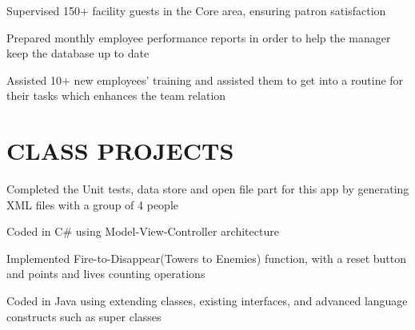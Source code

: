\documentclass[]{deedy-resume-openfont}
\begin{document}
\begin{minipage}[t]{0.66\textwidth}
\begin{tightemize}
\item Supervised 150+ facility guests in the Core area, ensuring patron satisfaction
\item Prepared monthly employee performance reports in order to help the manager keep the database up to date
\item Assisted 10+ new employees' training and assisted them to get into a routine for their tasks which enhances the team relation
\end{tightemize}
\sectionsep
\sectionsep

\section{CLASS PROJECTS}
\begin{tightemize}
\item Completed the Unit tests, data store and open file part for this app by generating XML files with a group of 4 people
\item Coded in C# using Model-View-Controller architecture
\end{tightemize}
\sectionsep

\begin{tightemize}
\item Implemented Fire-to-Disappear(Towers to Enemies) function, with a reset button and points and lives counting operations
\item Coded in Java using extending classes, existing interfaces, and advanced language constructs such as super classes
\end{tightemize}
\sectionsep



\end{minipage}
\end{document}
